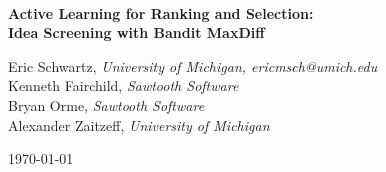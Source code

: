 \documentclass[nonblindrev]{informs3}
\newcommand{\titleofthispaper}{
	\textbf{Active Learning for Ranking and Selection: \\
	Idea Screening with Bandit MaxDiff} 
}
\begin{document}

\begin{center}

	~ \\

	\vspace{2in}

	\titleofthispaper

	\vspace{1in}

	{Eric Schwartz,}
	\emph{University of Michigan, {ericmsch@umich.edu} } \\
	{Kenneth Fairchild,} 
	\emph{Sawtooth Software} \\
	{Bryan Orme,}
	\emph{Sawtooth Software} \\
	{Alexander Zaitzeff,}
	\emph{University of Michigan} 

	\vspace{1in}

	\today


\end{center}







\end{document}
